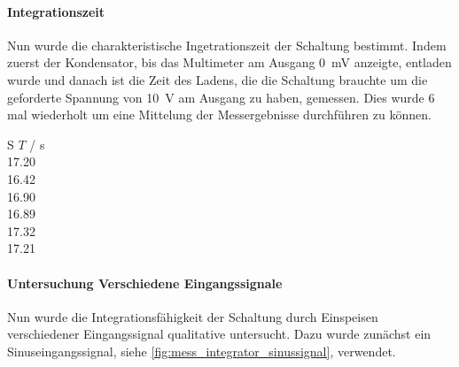 \documentclass[12pt,english,ngerman]{scrartcl}
\begin{document}
\paragraph{Integrationszeit}
Nun wurde die charakteristische Ingetrationszeit der Schaltung bestimmt. Indem
zuerst der Kondensator, bis das Multimeter am Ausgang \SI{0}{\mV} anzeigte,
entladen wurde und danach ist die Zeit des Ladens, die die Schaltung brauchte
um die geforderte Spannung von \SI{10}{\volt} am Ausgang zu haben, gemessen.
Dies wurde 6 mal wiederholt um eine Mittelung der Messergebnisse durchführen zu
können.

\begin{table}
  \caption{Messungen der Integrationszeit der realen Integratorschaltung aus
  \autoref{fig:sim_integrator_schaltung}, wobei $T$ die Ladezeit bis am Ausgang
  \SI{10}{\volt} anliegt. Bei einem Ladespannung \SI{91.8}{\milli\volt}, einem
  Widerstand von \SI{21.9}{\kilo\ohm} und einer Kapazität von
  \SI{6.8}{\micro\farad} }
  \label{tab:messungen_integration}
  \centering
  \begin{tabular}[c]{S}
    {$T$ / \si{\second}} \\
    17.20 \\
    16.42 \\
    16.90 \\
    16.89 \\
    17.32 \\
    17.21 \\
  \end{tabular}
\end{table}


\paragraph{Untersuchung Verschiedene Eingangssignale}
Nun wurde die Integrationsfähigkeit der Schaltung durch Einspeisen
verschiedener Eingangssignal qualitative untersucht. Dazu wurde zunächst ein
Sinuseingangssignal, siehe \autoref{fig:mess_integrator_sinussignal}, verwendet.
 
\end{document}
